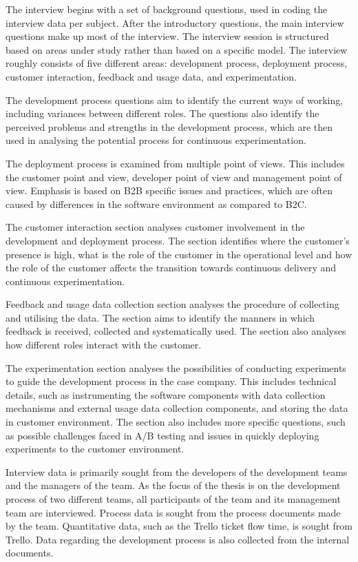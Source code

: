 \documentclass[english]{tktltiki2}
\theoremstyle{definition}
\theoremstyle{remark}
\begin{document}
The interview begins with a set of background questions, used in coding the interview data per subject. After the introductory questions, the main interview questions make up most of the interview. The interview session is structured based on areas under study rather than based on a specific model. The interview roughly consists of five different areas: development process, deployment process, customer interaction, feedback and usage data, and experimentation.

The development process questions aim to identify the current ways of working, including variances between different roles. The questions also identify the perceived problems and strengths in the development process, which are then used in analysing the potential process for continuous experimentation. 

The deployment process is examined from multiple point of views. This includes the customer point and view, developer point of view and management point of view. Emphasis is based on B2B specific issues and practices, which are often caused by differences in the software environment as compared to B2C.  

The customer interaction section analyses customer involvement in the development and deployment process. The section identifies where the customer's presence is high, what is the role of the customer in the operational level and how the role of the customer affects the transition towards continuous delivery and continuous experimentation. 

Feedback and usage data collection section analyses the procedure of collecting and utilising the data. The section aims to identify the manners in which feedback is received, collected and systematically used. The section also analyses how different roles interact with the customer. 

The experimentation section analyses the possibilities of conducting experiments to guide the development process in the case company. This includes technical details, such as instrumenting the software components with data collection mechanisms and external usage data collection components, and storing the data in customer environment. The section also includes more specific questions, such as possible challenges faced in A/B testing and issues in quickly deploying experiments to the customer environment.  

Interview data is primarily sought from the developers of the development teams and the managers of the team. As the focus of the thesis is on the development process of two different teams, all participants of the team and its management team are interviewed. Process data is sought from the process documents made by the team. Quantitative data, such as the Trello ticket flow time, is sought from Trello. Data regarding the development process is also collected from the internal documents.
\end{document}

